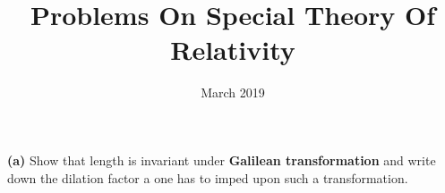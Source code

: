 \documentclass[11pt,one column]{article}
\title{Problems On Special Theory Of Relativity }
\date{March 2019}
\begin{document}
\maketitle
\textbf{\Large (a)} Show that length is invariant under \textbf{Galilean transformation} and write down the dilation factor a one has to imped upon such a transformation.
\end{document}
